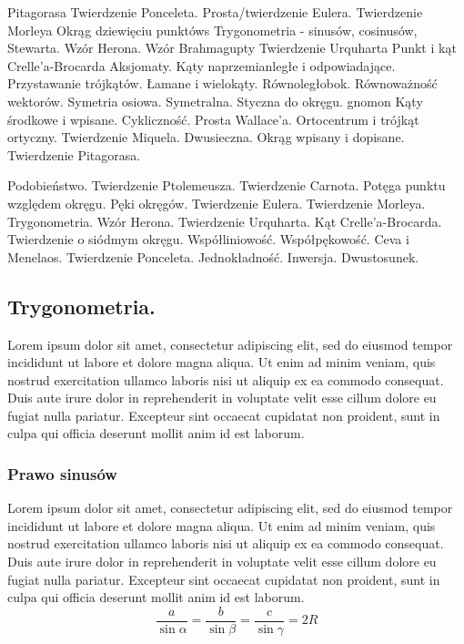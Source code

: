 Pitagorasa %
Twierdzenie Ponceleta.
Prosta/twierdzenie Eulera.
Twierdzenie Morleya
Okrąg dziewięciu punktóws
Trygonometria - sinusów, cosinusów, Stewarta.
Wzór Herona.
Wzór Brahmagupty
Twierdzenie Urquharta
Punkt i kąt Crelle'a-Brocarda
Aksjomaty. Kąty naprzemianległe i odpowiadające.
Przystawanie trójkątów.
Łamane i wielokąty.
Równoległobok.
Równoważność wektorów.
Symetria osiowa.
Symetralna.
Styczna do okręgu.
gnomon %
Kąty środkowe i wpisane.
Cykliczność. Prosta Wallace'a.
Ortocentrum i trójkąt ortyczny.
Twierdzenie Miquela.
Dwusieczna. Okrąg wpisany i dopisane.
Twierdzenie Pitagorasa.

Podobieństwo.
Twierdzenie Ptolemeusza.
Twierdzenie Carnota.
Potęga punktu względem okręgu.
Pęki okręgów.
Twierdzenie Eulera.
Twierdzenie Morleya.
Trygonometria. Wzór Herona.
Twierdzenie Urquharta.
Kąt Crelle'a-Brocarda.
Twierdzenie o siódmym okręgu.
Współliniowość.
Współpękowość.
Ceva i Menelaos.
Twierdzenie Ponceleta.
Jednokładność.
Inwersja.
Dwustosunek.


\subsection{Trygonometria.} Lorem ipsum dolor sit amet, consectetur adipiscing elit, sed do eiusmod tempor incididunt ut labore et dolore magna aliqua. Ut enim ad minim veniam, quis nostrud exercitation ullamco laboris nisi ut aliquip ex ea commodo consequat. Duis aute irure dolor in reprehenderit in voluptate velit esse cillum dolore eu fugiat nulla pariatur. Excepteur sint occaecat cupidatat non proident, sunt in culpa qui officia deserunt mollit anim id est laborum.
\subsubsection{Prawo sinusów}
Lorem ipsum dolor sit amet, consectetur adipiscing elit, sed do eiusmod tempor incididunt ut labore et dolore magna aliqua. Ut enim ad minim veniam, quis nostrud exercitation ullamco laboris nisi ut aliquip ex ea commodo consequat. Duis aute irure dolor in reprehenderit in voluptate velit esse cillum dolore eu fugiat nulla pariatur. Excepteur sint occaecat cupidatat non proident, sunt in culpa qui officia deserunt mollit anim id est laborum.
$$\frac{a}{\sin \alpha} = \frac{b}{\sin \beta} = \frac{c}{\sin \gamma} = 2R$$


